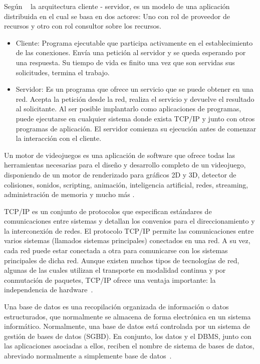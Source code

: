 
Según ~\cite{moyano2020arquitectura} la arquitectura cliente - servidor, es un modelo de una aplicación distribuida en el cual se basa en dos actores: Uno con rol de proveedor de recursos y otro con rol consultor sobre los recursos.
\begin{itemize}
    \item Cliente: Programa ejecutable que participa activamente en el establecimiento de las conexiones. Envía una petición al servidor y se queda esperando por una respuesta. Su tiempo de vida es finito una vez que son servidas sus solicitudes, termina el trabajo.
    \item Servidor: Es un programa que ofrece un servicio que se puede obtener en una red. Acepta la petición desde la red, realiza el servicio y devuelve el resultado al solicitante. Al ser posible implantarlo como aplicaciones de programas, puede ejecutarse en cualquier sistema donde exista TCP/IP y junto con otros programas de aplicación. El servidor comienza su ejecución antes de comenzar la interacción con el cliente.
\end{itemize}

Un motor de videojuegos es una aplicación de software que ofrece todas las herramientas necesarias para el diseño y desarrollo completo de un videojuego, disponiendo de un motor de renderizado para gráficos 2D y 3D, detector de colisiones, sonidos, scripting, animación, inteligencia artificial, redes, streaming, administración de memoria y mucho más \cite{arce2011desarrollo}.

TCP/IP es un conjunto de protocolos que especifican estándares de comunicaciones entre sistemas y detallan los convenios para el direccionamiento y la interconexión de redes. El protocolo TCP/IP permite las comunicaciones entre varios sistemas (llamados sistemas principales) conectados en una red. A su vez, cada red puede estar conectada a otra para comunicarse con los sistemas principales de dicha red. Aunque existen muchos tipos de tecnologías de red, algunas de las cuales utilizan el transporte en modalidad continua y por conmutación de paquetes, TCP/IP ofrece una ventaja importante: la independencia de hardware~\cite{protocolo-tcp-ip}.

Una base de datos es una recopilación organizada de información o datos estructurados, que normalmente se almacena de forma electrónica en un sistema informático. Normalmente, una base de datos está controlada por un sistema de gestión de bases de datos (SGBD). En conjunto, los datos y el DBMS, junto con las aplicaciones asociadas a ellos, reciben el nombre de sistema de bases de datos, abreviado normalmente a simplemente base de datos~\cite{Quéesuna68}.

